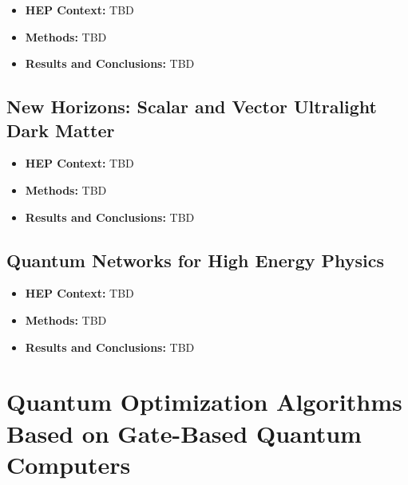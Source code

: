 \begin{itemize}
	\item \textbf{HEP Context: }TBD
	\item \textbf{Methods: }TBD
	\item \textbf{Results and Conclusions: }TBD
\end{itemize}\subsection{New Horizons: Scalar and Vector Ultralight Dark Matter~\cite{Antypas:2022asj}}
\begin{itemize}
	\item \textbf{HEP Context: }TBD
	\item \textbf{Methods: }TBD
	\item \textbf{Results and Conclusions: }TBD
\end{itemize}\subsection{Quantum Networks for High Energy Physics~\cite{Derevianko:2022lmn}}
\begin{itemize}
	\item \textbf{HEP Context: }TBD
	\item \textbf{Methods: }TBD
	\item \textbf{Results and Conclusions: }TBD
\end{itemize}

\section{Quantum Optimization Algorithms Based on Gate-Based Quantum Computers}

